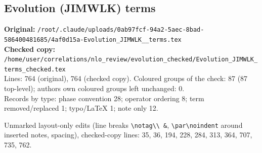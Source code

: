 \documentclass[10pt]{article}
\begin{document}
\subsection{Evolution (JIMWLK) terms}\label{sec:file-ev_jimwlk}
\noindent\textbf{Original:} \texttt{/root/.claude/uploads/0ab97fcf-94a2-5aec-8bad-586400481685/4af0d15a-Evolution\_JIMWLK\_\_terms.tex}\\\textbf{Checked copy:} \texttt{/home/user/correlations/nlo\_review/evolution\_checked/Evolution\_JIMWLK\_terms\_checked.tex}\\
Lines: 764 (original), 764 (checked copy). Coloured groups of the check: 87 (87 top-level); author\textquotesingle s own coloured groups left unchanged: 0.\\
Records by type: phase convention 28; operator ordering 8; term removed/replaced 1; typo/LaTeX 1; note only 12.
\par\noindent Unmarked layout-only edits (line breaks \texttt{\textbackslash notag\textbackslash\textbackslash\ \&}, \texttt{\textbackslash par\textbackslash noindent} around inserted notes, spacing), checked-copy lines: 35, 36, 194, 228, 284, 313, 364, 707, 735, 762.
\end{document}
